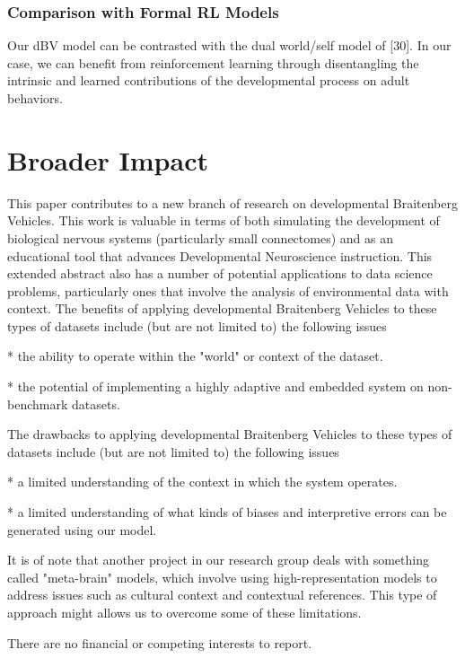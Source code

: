 \documentclass{article}
\begin{document}
\subsubsection*{Comparison with Formal RL Models}

Our dBV model can be contrasted with the dual world/self model of [30]. In our case, we can benefit from reinforcement learning through disentangling the intrinsic and learned contributions of the developmental process on adult behaviors.

\section*{Broader Impact}
This paper contributes to a new branch of research on developmental Braitenberg Vehicles. This work is valuable in terms of both simulating the development of biological nervous systems (particularly small connectomes) and as an educational tool that advances Developmental Neuroscience instruction. This extended abstract also has a number of potential applications to data science problems, particularly ones that involve the analysis of environmental data with context. The benefits of applying developmental Braitenberg Vehicles to these types of datasets include (but are not limited to) the following issues

* the ability to operate within the "world" or context of the dataset.

* the potential of implementing a highly adaptive and embedded system on non-benchmark datasets.

The drawbacks to applying developmental Braitenberg Vehicles to these types of datasets include (but are not limited to) the following issues

* a limited understanding of the context in which the system operates.

* a limited understanding of what kinds of biases and interpretive errors can be generated using our model.

It is of note that another project in our research group deals with something called "meta-brain" models, which involve using high-representation models to address issues such as cultural context and contextual references. This type of approach might allows us to overcome some of these limitations.

\begin{ack}
There are no financial or competing interests to report.
\end{ack}
\end{document}
